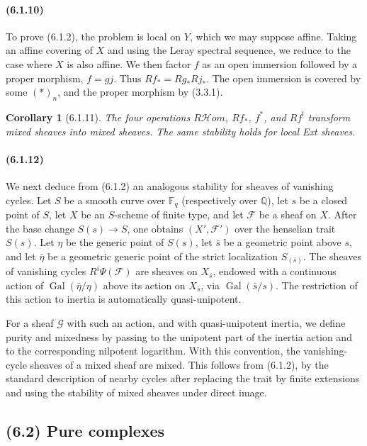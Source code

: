 \documentclass[11pt]{article}
\newtheorem{corollary}{Corollary}
\theoremstyle{remark}
\newcommand{\QQ}{\mathbb{Q}}
\newcommand{\Fq}{\mathbb{F}_q}
\begin{document}
\paragraph{(6.1.10)}
To prove (6.1.2), the problem is local on \(Y\), which we may suppose affine.  Taking an affine covering of \(X\) and using the Leray spectral sequence, we reduce to the case where \(X\) is also affine.  We then factor \(f\) as an open immersion followed by a proper morphism, \(f=gj\).  Thus \(Rf_*=Rg_*Rj_*\).  The open immersion is covered by some \((*)_n\), and the proper morphism by (3.3.1).

\begin{corollary}[6.1.11]
The four operations \(R\mathcal Hom\), \(Rf_*\), \(f^*\), and \(Rf^!\) transform mixed sheaves into mixed sheaves.  The same stability holds for local Ext sheaves.
\end{corollary}

\paragraph{(6.1.12)}
We next deduce from (6.1.2) an analogous stability for sheaves of vanishing cycles.  Let \(S\) be a smooth curve over \(\Fq\) (respectively over \(\QQ\)), let \(s\) be a closed point of \(S\), let \(X\) be an \(S\)-scheme of finite type, and let \(\mathcal F\) be a sheaf on \(X\).  After the base change \(S(s)\to S\), one obtains \((X',\mathcal F')\) over the henselian trait \(S(s)\).  Let \(\eta\) be the generic point of \(S(s)\), let \(\bar s\) be a geometric point above \(s\), and let \(\bar\eta\) be a geometric generic point of the strict localization \(S_{(\bar s)}\).  The sheaves of vanishing cycles \(R^i\Psi(\mathcal F)\) are sheaves on \(X_{\bar s}\), endowed with a continuous action of \(\operatorname{Gal}(\bar\eta/\eta)\) above its action on \(X_{\bar s}\), via \(\operatorname{Gal}(\bar s/s)\).  The restriction of this action to inertia is automatically quasi-unipotent.

For a sheaf \(\mathcal G\) with such an action, and with quasi-unipotent inertia, we define purity and mixedness by passing to the unipotent part of the inertia action and to the corresponding nilpotent logarithm.  With this convention, the vanishing-cycle sheaves of a mixed sheaf are mixed.  This follows from (6.1.2), by the standard description of nearby cycles after replacing the trait by finite extensions and using the stability of mixed sheaves under direct image.

\subsection*{(6.2) Pure complexes}
\end{document}

